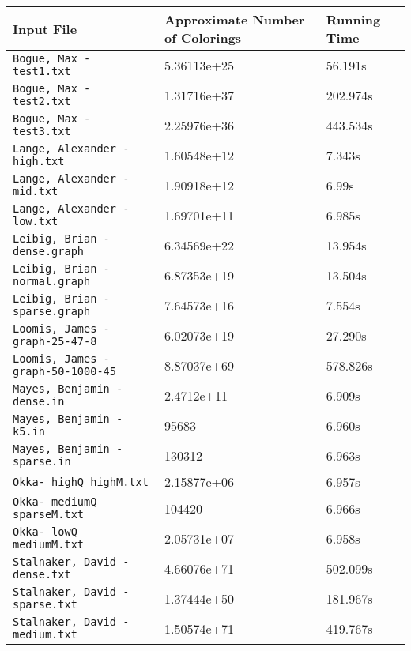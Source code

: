 \documentclass[12]{article}
\begin{document}
\begin{center}
\begin{tabular}{|l|l|l|}
\hline
Input File & Approximate Number of Colorings & Running Time \\\hline
\texttt{Bogue, Max - test1.txt} & 5.36113e+25 & 56.191s\\\hline
\texttt{Bogue, Max - test2.txt} & 1.31716e+37 & 202.974s\\\hline
\texttt{Bogue, Max - test3.txt} & 2.25976e+36 & 443.534s\\\hline
\texttt{Lange, Alexander - high.txt} & 1.60548e+12 & 7.343s\\\hline
\texttt{Lange, Alexander - mid.txt} & 1.90918e+12 & 6.99s\\\hline
\texttt{Lange, Alexander - low.txt} & 1.69701e+11 & 6.985s\\\hline
\texttt{Leibig, Brian - dense.graph} & 6.34569e+22 & 13.954s\\\hline
\texttt{Leibig, Brian - normal.graph} & 6.87353e+19 & 13.504s\\\hline
\texttt{Leibig, Brian - sparse.graph} & 7.64573e+16 & 7.554s\\\hline
\texttt{Loomis, James - graph-25-47-8} & 6.02073e+19 & 27.290s\\\hline
\texttt{Loomis, James - graph-50-1000-45} & 8.87037e+69 & 578.826s\\\hline
\texttt{Mayes, Benjamin - dense.in} & 2.4712e+11 & 6.909s \\\hline
\texttt{Mayes, Benjamin - k5.in} & 95683 & 6.960s\\\hline
\texttt{Mayes, Benjamin - sparse.in} & 130312 & 6.963s\\\hline
\texttt{Okka- highQ highM.txt} & 2.15877e+06 & 6.957s\\\hline
\texttt{Okka- mediumQ sparseM.txt} & 104420 & 6.966s\\\hline
\texttt{Okka- lowQ mediumM.txt} & 2.05731e+07 & 6.958s\\\hline
\texttt{Stalnaker, David - dense.txt}  &  4.66076e+71 & 502.099s\\\hline
\texttt{Stalnaker, David - sparse.txt} & 1.37444e+50 & 181.967s \\\hline
\texttt{Stalnaker, David - medium.txt} &  1.50574e+71 &419.767s\\\hline
\end{tabular}
\end{center}
\end{document}
